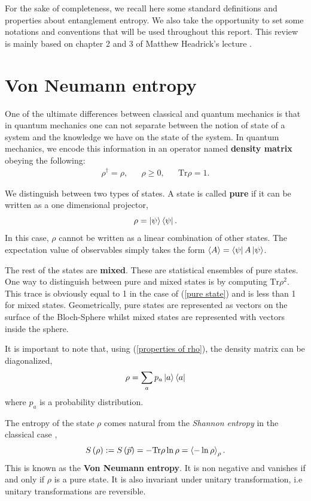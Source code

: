 For the sake of completeness, we recall here some standard definitions and properties about entanglement entropy. We also take the opportunity to set some notations and conventions that will be used throughout this report. This review is mainly based on chapter 2 and 3 of Matthew Headrick's lecture \cite{entropy}.

\section{Von Neumann entropy}

One of the ultimate differences between classical and quantum mechanics is that in quantum mechanics one can not separate between the notion of state of a system and the knowledge we have on the state of the system. In quantum mechanics, we encode this information in an operator named \textbf{density matrix} obeying the following:
\begin{align}\label{properties of rho}
    \rho^\dagger = \rho,         &&           \rho \geq 0,          &&        \text{Tr}\rho=1.
\end{align}

We distinguish between two types of states. A state is called \textbf{pure} if it can be written as a one dimensional projector,
\begin{equation}\label{pure state}
    \rho = \ket{\psi}\bra{\psi}.
\end{equation}
In this case, $\rho$ cannot be written as a linear combination of other states. The expectation value of observables simply takes the form $\Braket{A}=\bra{\psi}A\ket{\psi}$.

The rest of the states are \textbf{mixed}. These are statistical ensembles of pure states. One way to distinguish between pure and mixed states is by computing $\text{Tr}\rho^2$. This trace is obviously equal to 1 in the case of (\ref{pure state}) and is less than 1 for mixed states. Geometrically, pure states are represented as vectors on the surface of the Bloch-Sphere whilst mixed states are represented with vectors inside the sphere.

It is important to note that, using (\ref{properties of rho}), the density matrix can be diagonalized,
\begin{equation}
    \rho = \sum_a p_a\ket{a}\bra{a}
\end{equation}
where $p_a$ is a probability distribution.

The entropy of the state $\rho$ comes natural from the \textit{Shannon entropy} in the classical case \cite{bengtsson_zyczkowski_2006},
\begin{equation}\label{Von Neumann}
    S\left(\rho\right):=S\left(\Vec{p}\right)=-\text{Tr}\rho\ln \rho = \braket{-\ln\rho}_\rho.
\end{equation}
This is known as the \textbf{Von Neumann entropy}. It is non negative and vanishes if and only if $\rho$ is a pure state. It is also invariant under unitary transformation, i.e unitary transformations are reversible.

